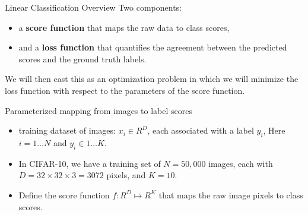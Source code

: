 \documentclass[14 pt]{beamer}
\let\olditem\item
\renewcommand{\item}{\olditem\vspace{4pt}}
\begin{document}
\begin{frame}{Linear Classification Overview}
Two components:
  \begin{itemize}
  \item  a \textbf{score function} that maps the raw data to class scores, 
  \item and a \textbf{loss function} that quantifies the agreement between the
    predicted scores and the ground truth labels.
  \end{itemize}
  We will then cast this as an optimization problem in which we will
  minimize the loss function with respect to the parameters of the score
  function.
\end{frame}

\begin{frame}{Parameterized mapping from images to label scores}
  \begin{itemize}
  \item training dataset of images:  $x_i \in R^D$, each associated with a
    label $y_i$, Here $i=1\ldots N$ and $y_i \in 1 \ldots K$.
\item In
  CIFAR-10,  we have a training set of $N = 50,000$ images, each with $D = 32 \times
  32 \times 3 = 3072$ pixels, and $K = 10$.
\item  Define the score function $f:R^D \mapsto R^K$ that
  maps the raw image pixels to class scores.
\end{itemize}
\end{frame}
\end{document}
